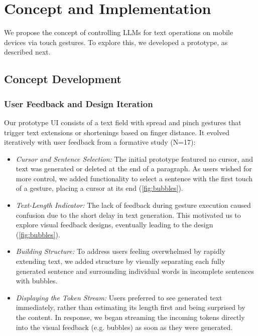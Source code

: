\section{Concept and Implementation}
\label{sec:implementation}
We propose the concept of controlling LLMs for text operations on mobile devices via touch gestures.
To explore this, we developed a prototype, as described next. %

\subsection{Concept Development}


\subsubsection{User Feedback and Design Iteration}
Our prototype UI consists of a text field with spread and pinch gestures that trigger text extensions or shortenings based on finger distance. It evolved iteratively with user feedback from a formative study (N=17):  

\begin{itemize}
\item \textit{Cursor and Sentence Selection:} The initial prototype featured no cursor, and text was generated or deleted at the end of a paragraph. As users wished for more control, we added functionality to select a sentence with the first touch of a gesture, placing a cursor at its end (\cref{fig:bubbles}).
\item \textit{Text-Length Indicator:} The lack of feedback during gesture execution caused confusion due to the short delay in text generation. This motivated us to explore visual feedback designs, eventually leading to the \visbubble{} design (\cref{fig:bubbles}). %
\item \textit{Building Structure:} To address users feeling overwhelmed by rapidly extending text, we added structure by visually separating each fully generated sentence and surrounding individual words in incomplete sentences with bubbles.
\item \textit{Displaying the Token Stream:} Users preferred to see generated text immediately, rather than estimating its length first and being surprised by the content. In response, we began streaming the incoming tokens directly into the visual feedback (e.g. bubbles) as soon as they were generated.
\end{itemize}

